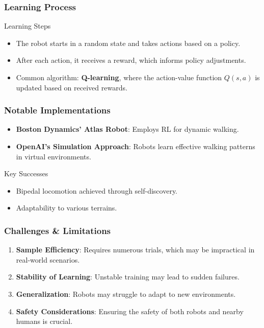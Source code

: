 \documentclass[aspectratio=169]{beamer}
\begin{document}
\begin{frame}[fragile]
    \frametitle{Learning Process}
    \begin{block}{Learning Steps}
        \begin{itemize}
            \item The robot starts in a random state and takes actions based on a policy.
            \item After each action, it receives a reward, which informs policy adjustments.
            \item Common algorithm: \textbf{Q-learning}, where the action-value function $Q(s, a)$ is updated based on received rewards.
        \end{itemize}
    \end{block}
\end{frame}

\begin{frame}[fragile]
    \frametitle{Notable Implementations}
    \begin{itemize}
        \item \textbf{Boston Dynamics' Atlas Robot}: Employs RL for dynamic walking.
        \item \textbf{OpenAI's Simulation Approach}: Robots learn effective walking patterns in virtual environments.
    \end{itemize}
    \begin{block}{Key Successes}
        \begin{itemize}
            \item Bipedal locomotion achieved through self-discovery.
            \item Adaptability to various terrains.
        \end{itemize}
    \end{block}
\end{frame}

\begin{frame}[fragile]
    \frametitle{Challenges & Limitations}
    \begin{enumerate}
        \item \textbf{Sample Efficiency}: Requires numerous trials, which may be impractical in real-world scenarios. 
        \item \textbf{Stability of Learning}: Unstable training may lead to sudden failures.
        \item \textbf{Generalization}: Robots may struggle to adapt to new environments.
        \item \textbf{Safety Considerations}: Ensuring the safety of both robots and nearby humans is crucial.
    \end{enumerate}
\end{frame}
\end{document}
